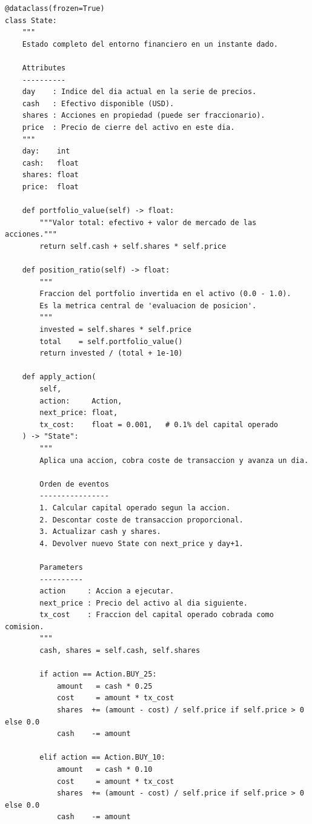 \documentclass[12pt, a4paper]{article}
\begin{document}
\begin{lstlisting}[caption={Clase \texttt{State} con coste de transacción y ratio de posición}]
@dataclass(frozen=True)
class State:
    """
    Estado completo del entorno financiero en un instante dado.

    Attributes
    ----------
    day    : Indice del dia actual en la serie de precios.
    cash   : Efectivo disponible (USD).
    shares : Acciones en propiedad (puede ser fraccionario).
    price  : Precio de cierre del activo en este dia.
    """
    day:    int
    cash:   float
    shares: float
    price:  float

    def portfolio_value(self) -> float:
        """Valor total: efectivo + valor de mercado de las acciones."""
        return self.cash + self.shares * self.price

    def position_ratio(self) -> float:
        """
        Fraccion del portfolio invertida en el activo (0.0 - 1.0).
        Es la metrica central de 'evaluacion de posicion'.
        """
        invested = self.shares * self.price
        total    = self.portfolio_value()
        return invested / (total + 1e-10)

    def apply_action(
        self,
        action:     Action,
        next_price: float,
        tx_cost:    float = 0.001,   # 0.1% del capital operado
    ) -> "State":
        """
        Aplica una accion, cobra coste de transaccion y avanza un dia.

        Orden de eventos
        ----------------
        1. Calcular capital operado segun la accion.
        2. Descontar coste de transaccion proporcional.
        3. Actualizar cash y shares.
        4. Devolver nuevo State con next_price y day+1.

        Parameters
        ----------
        action     : Accion a ejecutar.
        next_price : Precio del activo al dia siguiente.
        tx_cost    : Fraccion del capital operado cobrada como comision.
        """
        cash, shares = self.cash, self.shares

        if action == Action.BUY_25:
            amount   = cash * 0.25
            cost     = amount * tx_cost
            shares  += (amount - cost) / self.price if self.price > 0 else 0.0
            cash    -= amount

        elif action == Action.BUY_10:
            amount   = cash * 0.10
            cost     = amount * tx_cost
            shares  += (amount - cost) / self.price if self.price > 0 else 0.0
            cash    -= amount


\end{lstlisting}
\end{document}
